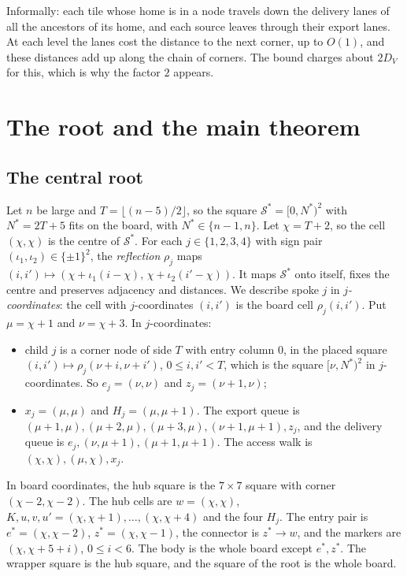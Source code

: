 \documentclass[11pt]{amsart}
\theoremstyle{definition}
\begin{document}
Informally: each tile whose home is in a node travels down the delivery lanes of all the ancestors of its
home, and each source leaves through their export lanes. At each level the lanes cost the distance to the next
corner, up to $O(1)$, and these distances add up along the chain of corners. The bound charges about $2D_V$ for
this, which is why the factor $2$ appears.

\section{The root and the main theorem}\label{sec:root}

\subsection{The central root}
Let $n$ be large and $T=\lfloor(n-5)/2\rfloor$, so the square $\mathcal S^*=[0,N^*)^2$ with $N^*=2T+5$ fits on
the board, with $N^*\in\{n-1,n\}$. Let $\chi=T+2$, so the cell $(\chi,\chi)$ is the centre of $\mathcal S^*$. For each
$j\in\{1,2,3,4\}$ with sign pair $(\iota_1,\iota_2)\in\{\pm1\}^2$, the \emph{reflection} $\rho_j$ maps
$(i,i')\mapsto(\chi+\iota_1(i-\chi),\,\chi+\iota_2(i'-\chi))$. It maps $\mathcal S^*$ onto itself, fixes the centre and preserves
adjacency and distances. We describe spoke $j$ in \emph{$j$-coordinates}: the cell with $j$-coordinates $(i,i')$ is the
board cell $\rho_j(i,i')$. Put $\mu=\chi+1$ and $\nu=\chi+3$. In $j$-coordinates:
\begin{itemize}[nosep]
\item child $j$ is a corner node of side $T$ with entry column $0$, in the placed square $(i,i')\mapsto\rho_j(\nu+i,\nu+i')$,
  $0\le i,i'<T$, which is the square $[\nu,N^*)^2$ in $j$-coordinates. So $e_j=(\nu,\nu)$ and $z_j=(\nu+1,\nu)$;
\item $x_j=(\mu,\mu)$ and $H_j=(\mu,\mu+1)$. The export queue is $(\mu+1,\mu),(\mu+2,\mu),(\mu+3,\mu),(\nu+1,\mu+1),z_j$, and the
  delivery queue is $e_j,(\nu,\mu+1),(\mu+1,\mu+1)$. The access walk is $(\chi,\chi),(\mu,\chi),x_j$.
\end{itemize}
In board coordinates, the hub square is the $7\times7$ square with corner $(\chi-2,\chi-2)$. The hub cells are $w=(\chi,\chi)$,
$K,u,v,u'=(\chi,\chi+1),\dots,(\chi,\chi+4)$ and the four $H_j$. The entry pair is $e^*=(\chi,\chi-2)$, $z^*=(\chi,\chi-1)$, the
connector is $z^*\to w$, and the markers are $(\chi,\chi+5+i)$, $0\le i<6$. The body is the whole board except $e^*,z^*$.
The wrapper square is the hub square, and the square of the root is the whole board.
\end{document}
